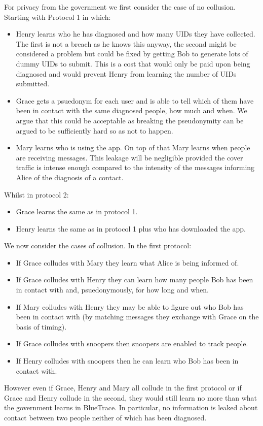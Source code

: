 \documentclass{article}
\begin{document}
For privacy from the government we first consider the case of no collusion. Starting with Protocol 1 in which:
\begin{itemize}
    \item Henry learns who he has diagnosed and how many UIDs they have collected. The first is not a breach as he knows this anyway, the second might be considered a problem but could be fixed by getting Bob to generate lots of dummy UIDs to submit. This is a cost that would only be paid upon being diagnosed and would prevent Henry from learning the number of UIDs submitted.
    \item Grace gets a psuedonym for each user and is able to tell which of them have been in contact with the same diagnosed people, how much and when. We argue that this could be acceptable as breaking the pseudonymity can be argued to be sufficiently hard so as not to happen.
    \item Mary learns who is using the app. On top of that Mary learns when people are receiving messages. This leakage will be negligible provided the cover traffic is intense enough compared to the intensity of the messages informing Alice of the diagnosis of a contact.
\end{itemize}
Whilst in protocol 2:
\begin{itemize}
    \item Grace learns the same as in protocol 1.
    \item Henry learns the same as in protocol 1 plus who has downloaded the app.
\end{itemize}

\noindent We now consider the cases of collusion. In the first protocol:
\begin{itemize}
    \item If Grace colludes with Mary they learn what Alice is being informed of.
    \item If Grace colludes with Henry they can learn how many people Bob has been in contact with and, psuedonymously, for how long and when.
    \item If Mary colludes with Henry they may be able to figure out who Bob has been in contact with (by matching messages they exchange with Grace on the basis of timing).
    \item If Grace colludes with snoopers then snoopers are enabled to track people.
    \item If Henry colludes with snoopers then he can learn who Bob has been in contact with.
\end{itemize}
However even if Grace, Henry and Mary all collude in the first protocol or if Grace and Henry collude in the second, they would still learn no more than what the government learns in BlueTrace. In particular, no information is leaked about contact between two people neither of which has been diagnosed.
\end{document}
